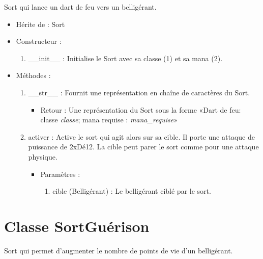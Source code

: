 \documentclass[12pt,pdftex,oneside]{article}
\begin{document}
  Sort qui lance un dart de feu vers un belligérant.

  \begin{itemize}
  \item Hérite de : Sort


  \item Constructeur : 

  \begin{enumerate}
  \item \_\_init\_\_ : Initialise le Sort avec sa classe (1) et sa mana (2).

  \end{enumerate}

  \item Méthodes : 

    \begin{enumerate}
    \item \_\_str\_\_ : Fournit une représentation en chaîne de caractères du Sort.
      \begin{itemize}
      \item Retour : Une représentation du Sort sous la forme «Dart de feu: classe \emph{classe}; mana requise : \emph{mana\_requise}»
      \end{itemize}
    \item activer : Active le sort qui agit alors sur sa cible. Il porte une
      attaque de puissance de 2xDé12. La cible peut parer le sort comme
      pour une attaque physique.
      \begin{itemize}
      \item Paramètres : 
        \begin{enumerate}
        \item cible (Belligérant) : Le belligérant ciblé par le sort.
        \end{enumerate}
      \end{itemize}

    \end{enumerate}
  \end{itemize}

  \section {Classe SortGuérison}

  Sort qui permet d'augmenter le nombre de points de vie d'un belligérant.
\end{document}
